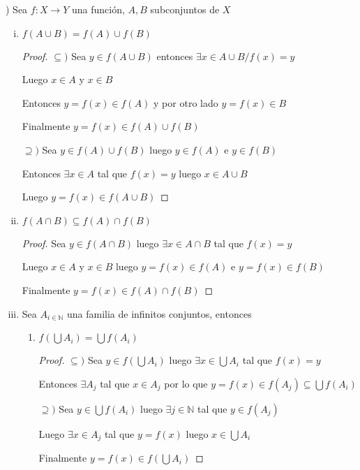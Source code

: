 \documentclass[12pt]{article}
\newcommand{\N}{\mathbb{N}}
\newcommand{\ra}{\rightarrow}
\theoremstyle{definition}
\begin{document}
\newpage
{}) Sea $f : X \ra Y$ una función, $A, B $ subconjuntos de $X$
\begin{enumerate}[i.]
  \item $f(A \cup B) = f(A) \cup f(B)$
    \begin{proof}
    $\subseteq )$ Sea $y \in f(A \cup B)$ entonces $\exists x \in A \cup B /  f(x) = y$ 

    Luego $x \in A$ y $ x \in B$ 

    Entonces  $ y = f(x) \in f(A)$ y por otro lado $y = f(x) \in B$

    Finalmente $y = f(x) \in f(A) \cup f(B)$

    $\supseteq )$ Sea $y \in f(A) \cup f(B)$ luego $y \in f(A)$ e $y \in f(B)$

    Entonces $\exists x \in A  $ tal que $ f(x) = y $ luego $ x \in A \cup B$

    Luego $y = f(x) \in f(A \cup B)$
    
    \end{proof}
  \item $f(A \cap B) \subseteq f(A) \cap f(B)$
    \begin{proof}
    
    Sea $ y \in f(A \cap B)$ luego $\exists x \in A \cap B$ tal que $f(x) = y$

    Luego $x \in A $ y $x \in B$ luego $y = f(x) \in f(A)$ e $y = f(x) \in f(B)$

    Finalmente $y = f(x) \in f(A) \cap f(B)$ 
    
    \end{proof}
  \item Sea $A_{i \in \N} $ una familia de infinitos conjuntos, entonces 
    \begin{enumerate}
      \item $f(\bigcup A_{i}) = \bigcup f(A_{i})$ 
	\begin{proof} $\subseteq )$ Sea $y \in f(\bigcup A_{i})$ luego $\exists x \in \bigcup A_{i}$ tal que $f(x) = y$

	Entonces $\exists A_{j}$ tal que $x \in A_{j}$ por lo que $y = f(x) \in f(A_{j}) \subseteq \bigcup f(A_{i})$

        $\supseteq )$ Sea $y \in \bigcup f(A_{i})$ luego $\exists j \in \N $ tal que $y \in f(A_{j})$

	Luego $\exists x \in A_{j} $ tal que $y = f(x)$ luego $x \in \bigcup A_{i}$

	Finalmente $y = f(x) \in f (\bigcup A_{i})$

        \end{proof}


\end{enumerate}
\end{enumerate}
\end{document}
